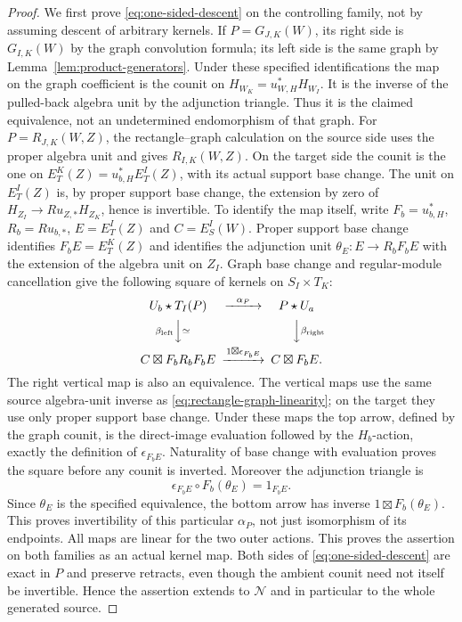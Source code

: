 \documentclass[11pt]{article}
\theoremstyle{definition}
\theoremstyle{remark}
\begin{document}
\begin{proof}
We first prove \eqref{eq:one-sided-descent} on the controlling family,
not by assuming descent of arbitrary kernels.  If $P=G_{J,K}(W)$,
its right side is $G_{I,K}(W)$ by the graph convolution formula;
its left side is the same graph by Lemma~\ref{lem:product-generators}.
Under these specified identifications the map on the graph coefficient
is the counit on
$H_{W_K}=u_{W,H}^*H_{W_I}$.
It is the inverse of the pulled-back algebra unit by the adjunction
triangle.  Thus it is the claimed equivalence, not an undetermined
endomorphism of that graph.
For $P=R_{J,K}(W,Z)$, the rectangle--graph calculation on the source
side uses the proper algebra unit and gives $R_{I,K}(W,Z)$.
On the target side the counit is the one on
$E_T^K(Z)=u_{b,H}^*E_T^I(Z)$, with its actual support base change.
The unit on $E_T^I(Z)$ is, by proper support base change, the
extension by zero of $H_{Z_I}\to Ru_{Z,*}H_{Z_K}$, hence is
invertible.  To identify the map itself, write
$F_b=u_{b,H}^*$, $R_b=Ru_{b,*}$, $E=E_T^I(Z)$ and
$C=E_S^I(W)$.  Proper support base change identifies
$F_bE=E_T^K(Z)$ and identifies the adjunction unit
$\theta_E:E\to R_bF_bE$ with the extension of the algebra unit on
$Z_I$.  Graph base change and regular-module cancellation give the
following square of kernels on $S_I\times T_K$:
\begin{equation}
\begin{CD}
 U_b\star T_I(P) @>{\alpha_P}>> P\star U_a\\
 @V{\beta_{\mathrm{left}}}V{\simeq}V
       @VV{\beta_{\mathrm{right}}}V\\
 C\boxtimes F_bR_bF_bE
       @>{1\boxtimes\epsilon_{F_bE}}>> C\boxtimes F_bE .
\end{CD}
\label{eq:rectangle-counit-square}
\end{equation}
The right vertical map is also an equivalence.  The vertical maps
use the same source algebra-unit inverse as
\eqref{eq:rectangle-graph-linearity}; on the target they use only
proper support base change.  Under these maps the top arrow, defined
by the graph counit, is the direct-image evaluation followed by the
$H_b$-action, exactly the definition of $\epsilon_{F_bE}$.
Naturality of base change with evaluation proves the square before
any counit is inverted.  Moreover the adjunction triangle is
\[
 \epsilon_{F_bE}\circ F_b(\theta_E)=1_{F_bE}.
\]
Since $\theta_E$ is the specified equivalence, the bottom arrow has
inverse $1\boxtimes F_b(\theta_E)$.  This proves invertibility of
this particular $\alpha_P$, not just isomorphism of its endpoints.
All maps are linear for the two outer actions.  This proves the
assertion on both families as an actual kernel map.  Both sides of \eqref{eq:one-sided-descent} are
exact in $P$ and preserve retracts, even though the ambient counit
need not itself be invertible.  Hence the assertion extends to
$\mathcal N$ and in particular to the whole generated source.


\end{proof}
\end{document}
